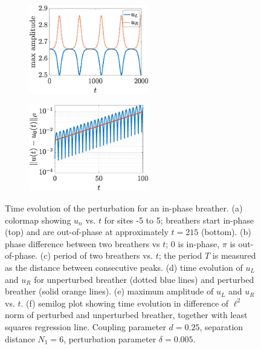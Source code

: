 \documentclass[12pt,reqno]{amsart}
\theoremstyle{definition}
\begin{document}
\begin{figure}
\begin{center}
\begin{subfigure}{0.3\linewidth}
		\label{fig:timestepSGunstabled}
	\end{subfigure}
		\begin{subfigure}{0.3\linewidth}
		\caption{}
		\includegraphics[width=5.25cm]{timestepN6ppmaxamp.eps} \hspace{-0.5cm}
		\label{fig:timestepSGunstablee}
	\end{subfigure}
	\begin{subfigure}{0.3\linewidth}
		\caption{}
		\includegraphics[width=5.25cm]{timestepN6ppgrowth.eps} \hspace{-0.5cm}
		\label{fig:timestepSGunstablef}
	\end{subfigure}
	\end{center}
	\caption{Time evolution of the perturbation for an in-phase breather. (a) colormap showing $u_n$ vs. $t$ for sites -5 to 5; breathers start in-phase (top) and are out-of-phase at approximately $t = 215$ (bottom). (b) phase difference between two breathers vs $t$; 0 is in-phase, $\pi$ is out-of-phase. (c) period of two breathers vs. $t$; the period $T$ is measured as the distance between consecutive peaks. (d) time evolution of $u_L$ and $u_R$ for unperturbed breather (dotted blue lines) and perturbed breather (solid orange lines). (e) maximum amplitude of $u_L$ and $u_R$ vs. $t$. (f) semilog plot showing time evolution in difference of $\ell^2$ norm of perturbed and unperturbed breather, together with least squares regression line. Coupling parameter $d=0.25$, separation distance $N_1 = 6$, perturbation parameter $\delta = 0.005$.}
	\label{fig:timestepSGunstable}
\end{figure}
\end{document}
